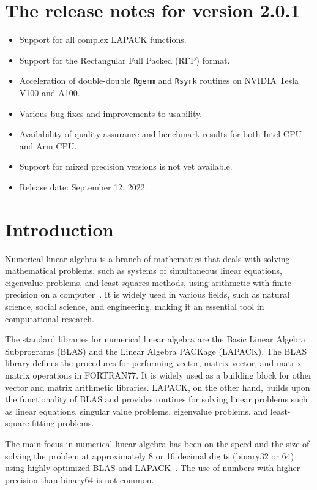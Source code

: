 \documentclass[12pt]{article}
\begin{document}
\section{The release notes for version 2.0.1}
\begin{itemize}
    \item Support for all complex LAPACK functions.
    \item Support for the Rectangular Full Packed (RFP) format.
    \item Acceleration of double-double {\tt Rgemm} and {\tt Rsyrk} routines on NVIDIA Tesla V100 and A100.
    \item Various bug fixes and improvements to usability.
    \item Availability of quality assurance and benchmark results for both Intel CPU and Arm CPU.
    \item Support for mixed precision versions is not yet available.
    \item Release date: September 12, 2022.
\end{itemize}

\section{Introduction}

Numerical linear algebra is a branch of mathematics that deals with solving mathematical problems, such as systems of simultaneous linear equations, eigenvalue problems, and least-squares methods, using arithmetic with finite precision on a computer~\cite{GoluVanl96}. It is widely used in various fields, such as natural science, social science, and engineering, making it an essential tool in computational research.

The standard libraries for numerical linear algebra are the Basic Linear Algebra Subprograms (BLAS)\cite{10.1145/567806.567807} and the Linear Algebra PACKage (LAPACK)\cite{laug}. The BLAS library defines the procedures for performing vector, matrix-vector, and matrix-matrix operations in FORTRAN77. It is widely used as a building block for other vector and matrix arithmetic libraries. LAPACK, on the other hand, builds upon the functionality of BLAS and provides routines for solving linear problems such as linear equations, singular value problems, eigenvalue problems, and least-square fitting problems.

The main focus in numerical linear algebra has been on the speed and the size of solving the problem at approximately 8 or 16 decimal digits (binary32 or 64) using highly optimized BLAS and LAPACK~\cite{4610935,10.1145/1356052.1356053,6413635,8519659,cublas,tdb10}. The use of numbers with higher precision than binary64 is not common.
\end{document}
